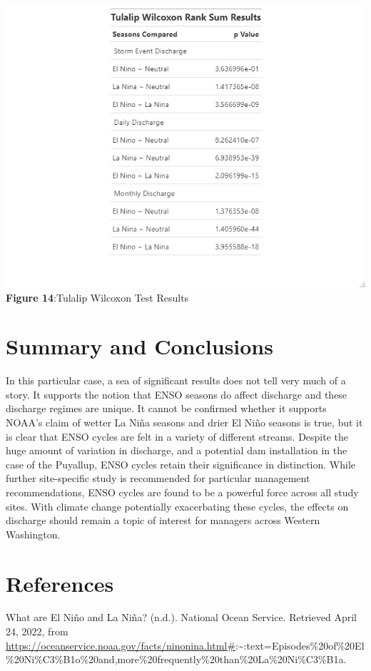 \documentclass[
  12pt,
]{article}
\begin{document}
\includegraphics{Data/Processed/Tables/TulaWTTable.jpeg} \textbf{Figure
14}:Tulalip Wilcoxon Test Results

\newpage

\hypertarget{summary-and-conclusions}{%
\section{Summary and Conclusions}\label{summary-and-conclusions}}

In this particular case, a sea of significant results does not tell very
much of a story. It supports the notion that ENSO seasons do affect
discharge and these discharge regimes are unique. It cannot be confirmed
whether it supports NOAA's claim of wetter La Niña seasons and drier El
Niño seasons is true, but it is clear that ENSO cycles are felt in a
variety of different streams. Despite the huge amount of variation in
discharge, and a potential dam installation in the case of the Puyallup,
ENSO cycles retain their significance in distinction. While further
site-specific study is recommended for particular management
recommendations, ENSO cycles are found to be a powerful force across all
study sites. With climate change potentially exacerbating these cycles,
the effects on discharge should remain a topic of interest for managers
across Western Washington.

\newpage

\hypertarget{references}{%
\section{References}\label{references}}

What are El Niño and La Niña? (n.d.). National Ocean Service. Retrieved
April 24, 2022, from
\url{https://oceanservice.noaa.gov/facts/ninonina.html\#}:\textasciitilde:text=Episodes\%20of\%20El\%20Ni\%C3\%B1o\%20and,more\%20frequently\%20than\%20La\%20Ni\%C3\%B1a.
\end{document}
